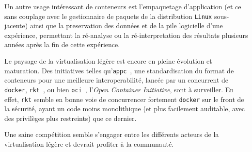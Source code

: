 \documentclass[a4paper]{article}
\begin{document}
Un autre usage int\'eressant de conteneurs est l'empaquetage d'application (et
ce sans couplage avec le gestionnaire de paquets de la distribution
\texttt{Linux} sous-jacente) ainsi que la preservation des donn\'ees et de la
pile logicielle d'une exp\'erience, permettant la r\'e-analyse ou la
r\'e-interpretation des r\'esultats plusieurs ann\'ees apr\`es la fin de cette
exp\'erience.

Le paysage de la virtualisation l\'eg\`ere est encore en pleine \'evolution et
maturation.
Des initiatives telles qu'\texttt{appc}~\cite{ref-appc}, une standardisation du
format de conteneurs pour une meilleure interoperabilit\'e, lanc\'ee par un
concurrent de \texttt{docker}, \texttt{rkt}~\cite{ref-rkt}, ou bien
\texttt{oci}~\cite{ref-oci}, l'\emph{Open Container Initiative}, sont \`a
surveiller.
En effet, \texttt{rkt} semble en bonne voie de concurrencer fortement \texttt{docker} sur
le front de la s\'ecurit\'e, ayant un code moins monolithique (et plus
facilement auditable, avec des privil\`eges plus restreints) que ce
dernier.

Une saine comp\'etition semble s'engager entre les diff\'erents acteurs de la
virtualisation l\'eg\`ere et devrait profiter \`a la communaut\'e.
\end{document}
